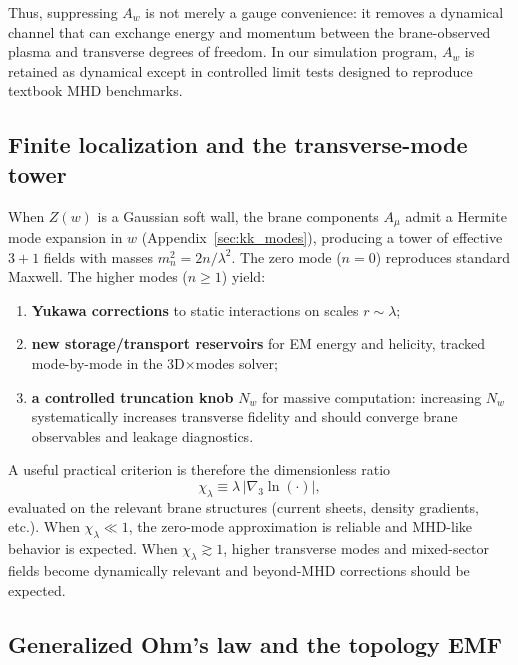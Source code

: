 \documentclass[11pt]{article}
\begin{document}
Thus, suppressing \(A_w\) is not merely a gauge convenience: it removes a dynamical channel
that can exchange energy and momentum between the brane-observed plasma and transverse degrees
of freedom. In our simulation program, \(A_w\) is retained as dynamical except in controlled
limit tests designed to reproduce textbook MHD benchmarks.

\subsection{Finite localization and the transverse-mode tower}
\label{sec:finite_localization_beyond}

When \(Z(w)\) is a Gaussian soft wall, the brane components \(A_\mu\) admit a Hermite mode
expansion in \(w\) (Appendix~\ref{sec:kk_modes}), producing a tower of effective \(3+1\)
fields with masses \(m_n^2=2n/\lambda^2\). The zero mode (\(n=0\)) reproduces standard
Maxwell. The higher modes (\(n\ge 1\)) yield:
\begin{enumerate}[leftmargin=1.6em]
\item \textbf{Yukawa corrections} to static interactions on scales \(r\sim\lambda\);
\item \textbf{new storage/transport reservoirs} for EM energy and helicity, tracked mode-by-mode
in the 3D\(\times\)modes solver;
\item \textbf{a controlled truncation knob} \(N_w\) for massive computation: increasing \(N_w\)
systematically increases transverse fidelity and should converge brane observables and leakage
diagnostics.
\end{enumerate}

A useful practical criterion is therefore the dimensionless ratio
\begin{equation}
\chi_\lambda \equiv \lambda\,|\nabla_3 \ln(\cdot)|,
\label{eq:chi_lambda_def}
\end{equation}
evaluated on the relevant brane structures (current sheets, density gradients, etc.).
When \(\chi_\lambda\ll 1\), the zero-mode approximation is reliable and MHD-like behavior is
expected. When \(\chi_\lambda\gtrsim 1\), higher transverse modes and mixed-sector fields
become dynamically relevant and beyond-MHD corrections should be expected.

\subsection{Generalized Ohm's law and the topology EMF}
\label{sec:generalized_ohm_preview}
\end{document}
